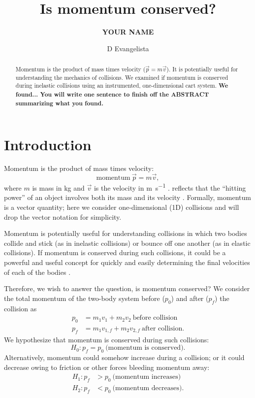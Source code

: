 \documentclass[aps,prl,preprint]{revtex4-1}
\begin{document}
\linenumbers
\title{Is momentum conserved?}
\author{\textbf{YOUR NAME}}
\author{D Evangelista}

\begin{abstract}
Momentum is the product of mass times velocity ($\vec{p}=m\vec{v}$). It is potentially useful for understanding the mechanics of collisions. We examined if momentum is conserved during inelastic collisions using an instrumented, one-dimensional cart system. \textbf{We found... You will write one sentence to finish off the ABSTRACT summarizing what you found.}
\end{abstract}
\maketitle
\section{Introduction}
Momentum is the product of mass times velocity:
\begin{equation}
\text{momentum}\ \vec{p} = m \vec{v},
\label{eq:momentum}
\end{equation}
where $m$ is mass in \si{\kilo\gram} and $\vec{v}$ is the velocity in \si{\meter\per\second} \cite{newton-1687-principia}.   reflects that the ``hitting power'' of an object involves both its mass and its velocity \cite{newton-1687-principia}. Formally, momentum is a vector quantity; here we consider one-dimensional (1D) collisions and will drop the vector notation for simplicity.  

Momentum is potentially useful for understanding collisions in which two bodies collide and stick (as in inelastic collisions) or bounce off one another (as in elastic collisions). If momentum is conserved during such collisions, it could be a powerful and useful concept for quickly and easily determining the final velocities of each of the bodies \cite{newton-1687-principia}. 

Therefore, we wish to answer the question, is momentum conserved? We consider the total momentum of the two-body system before ($p_0$) and after ($p_f$) the collision as
\begin{align}
p_0 &= m_1 v_1 + m_2 v_2\ \text{before collision} \\
p_f &= m_1 v_{1,f} + m_2 v_{2,f}\ \text{after collision}. 
\end{align}
We hypothesize that momentum is conserved during such collisions:
\begin{equation}
H_0: p_f = p_0\ \text{(momentum is conserved)}.
\end{equation}
Alternatively, momentum could somehow increase during a collision; or it could decrease owing to friction or other forces bleeding momentum away: 
\begin{align}
H_1: p_f &> p_0\ \text{(momentum increases)} \\
H_2: p_f &< p_0\ \text{(momentum decreases)} .
\end{align}
\end{document}
